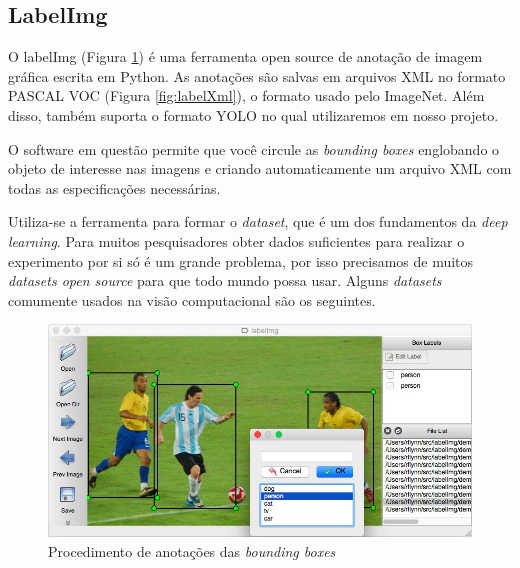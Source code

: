 \subsection{LabelImg}

O labelImg (Figura \ref{fig:labelimg}) é uma ferramenta open source de anotação de imagem gráfica escrita em Python. As anotações são salvas em arquivos XML no formato PASCAL VOC (Figura \ref{fig:labelXml}), o formato usado pelo ImageNet. Além disso, também suporta o formato YOLO no qual utilizaremos em nosso projeto. \cite{labelimg}

O software em questão permite que você circule as \textit{bounding boxes} englobando o objeto de interesse nas imagens e criando automaticamente um arquivo XML com todas as especificações necessárias.

Utiliza-se a ferramenta para formar o \textit{dataset}, que é um dos fundamentos da \textit{deep learning}. Para muitos pesquisadores obter dados suficientes para realizar o experimento por si só é um grande problema, por isso precisamos de muitos \textit{datasets open source} para que todo mundo possa usar. Alguns \textit{datasets} comumente usados na visão computacional são os seguintes.

\begin{figure}[htbp]
	\centering
	\includegraphics[width=0.9\linewidth]{figuras/MachineLearning/labelimg.jpg}
	\caption{Procedimento de anotações das \textit{bounding boxes}}
	\label{fig:labelimg}
\end{figure}

